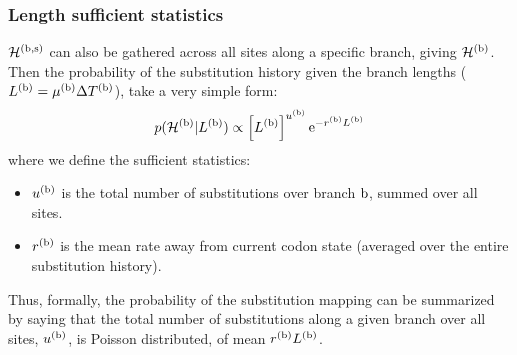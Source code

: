 \subsubsection{Length sufficient statistics}
$\mathcal{H}^{(\text{b}, \text{s})}$ can also be gathered across all sites along a specific branch, giving $\mathcal{H}^{(\text{b})}$.
Then the probability of the substitution history given the branch lengths ($L^{(\text{b})} = \mu^{(\text{b})} \Delta T^{(\text{b})}$), take a very simple form:
\begin{equation}
\label{eq:LengthSuffStat}
p(\mathcal{H}^{(\text{b})} | L^{(\text{b})}) \propto \left[ L^{(\text{b})}\right]^{u^{(\text{b})}} \mathrm{e}^{- r^{(\text{b})} L^{(\text{b})}}
\end{equation}
where we define the sufficient statistics:
\begin{itemize}
	\setlength\itemsep{-0.25em}
	\item $u^{(\text{b})}$ is the total number of substitutions over branch $\text{b}$, summed over all sites.
	\item $r^{(\text{b})}$ is the mean rate away from current codon state (averaged over the entire substitution history).
\end{itemize}
Thus, formally, the probability of the substitution mapping can be summarized by saying that the total number of substitutions along a given branch over all sites, $u^{(\text{b})}$, is Poisson distributed, of mean $r^{(\text{b})} L^{(\text{b})}$.

